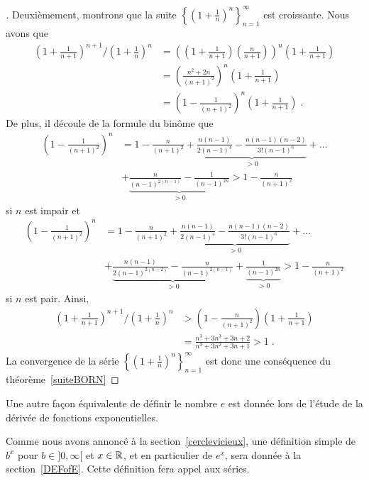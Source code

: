 {\begin{proof}[\theory]
Deuxièmement, montrons que la suite
$\displaystyle \left\{\left(1+\frac{1}{n}\right)^n\right\}_{n=1}^\infty$
est croissante.  Nous avons que
\begin{align*}
\left(1+\frac{1}{n+1}\right)^{n+1}\bigg/
\left(1+\frac{1}{n}\right)^n
&= \left( \left(1+\frac{1}{n+1}\right)\left(\frac{n}{n+1}\right) \right)^n
\left(1+\frac{1}{n+1}\right) \\
&= \left( \frac{n^2+2n}{(n+1)^2} \right)^n
\left(1+\frac{1}{n+1}\right) \\
&= \left(1- \frac{1}{(n+1)^2} \right)^n \left(1+\frac{1}{n+1}\right) \; .
\end{align*}
De plus, il découle de la formule du binôme que
\begin{align*}
\left(1- \frac{1}{(n+1)^2} \right)^n &=
1 - \frac{n}{(n+1)^2} + \underbrace{\frac{n(n-1)}{2(n-1)^4} -
\frac{n(n-1)(n-2)}{3!(n-1)^6}}_{>0} + \ldots \\
& + \underbrace{\frac{n}{(n-1)^{2(n-1)}} - \frac{1}{(n-1)^{2n}}}_{>0}
> 1 - \frac{n}{(n+1)^2}
\end{align*}
si $n$ est impair et
\begin{align*}
\left(1- \frac{1}{(n+1)^2} \right)^n &=
1 - \frac{n}{(n+1)^2} + \underbrace{\frac{n(n-1)}{2(n-1)^4} -
\frac{n(n-1)(n-2)}{3!(n-1)^6}}_{>0} + \ldots \\
&+ \underbrace{\frac{n(n-1)}{2(n-1)^{2(n-2)}} -
\frac{n}{(n-1)^{2(n-1)}}}_{>0} + \underbrace{\frac{1}{(n-1)^{2n}}}_{>0}
> 1 - \frac{n}{(n+1)^2}
\end{align*}
si $n$ est pair.  Ainsi,
\begin{align*}
\left(1+\frac{1}{n+1}\right)^{n+1}\bigg/
\left(1+\frac{1}{n}\right)^n
&> \left(1 - \frac{n}{(n+1)^2}\right)\left(1+\frac{1}{n+1}\right) \\
&= \frac{n^3+3n^3+3n+2}{n^3+3n^2+3n+1}>1 \; .
\end{align*}
La convergence de la série
$\displaystyle \left\{\left(1+\frac{1}{n}\right)^n\right\}_{n=1}^\infty$
est donc une conséquence du théorème~\ref{suiteBORN}
\end{proof}

\begin{rmk}
Une autre façon équivalente de définir le nombre $e$ est donnée
lors de l'étude de la dérivée de fonctions exponentielles.
\end{rmk}

\begin{rmk}[\theory]
Comme nous avons annoncé à la section~\ref{cerclevicieux},
une définition simple de $b^x$ pour $b\in]0,\infty[$ et $x\in \mathbb{R}$, et
en particulier de $e^x$, sera donnée à la section~\ref{DEFofE}. 
Cette définition fera appel aux séries.
\end{rmk}

}
